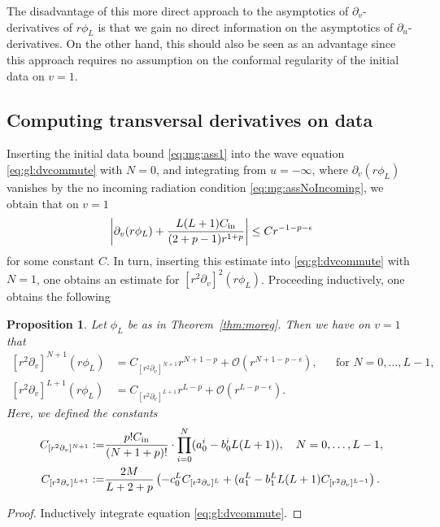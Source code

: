 \documentclass[11pt,english]{article}
\numberwithin{equation}{section}
\theoremstyle{remark}
\theoremstyle{plain}
\newtheorem{prop}{Proposition}[section]
\theoremstyle{remark}
\newcommand{\pu}{\partial_u}
\newcommand{\pv}{\partial_v}
\renewcommand{\(}{\left(}
\renewcommand{\)}{\right)}
\begin{document}
The disadvantage of this more direct approach to the asymptotics of $\pv$-derivatives of $r\phi_L$ is that we gain no direct information on the asymptotics of $\pu$-derivatives. On the other hand, this should also be seen as an advantage since this approach requires no assumption on the conformal regularity of the initial data on $v=1$. 

\subsection{Computing transversal derivatives on data}\label{sec:mg:data}
Inserting the initial data bound \eqref{eq:mg:ass1} into the wave equation \eqref{eq:gl:dvcommute} with $N=0$, and integrating from $u=-\infty$, where $\pv(r\phi_L)$ vanishes by the no incoming radiation condition \eqref{eq:mg:assNoIncoming}, we obtain that on $v=1$
\begin{equation}
\left|\pv(r\phi_L)+\frac{L(L+1)\ci}{(2+p-1)r^{1+p}}\right|\leq C r^{-1-p-\epsilon}
\end{equation}
for some constant $C$.
In turn, inserting this estimate into \eqref{eq:gl:dvcommute} with $N=1$, one obtains an estimate for $[r^2\pv]^2(r\phi_L)$. Proceeding inductively, one obtains the following
\newcommand{\cv}[1]{C_{[r^2\pv]^{#1}}}
\begin{prop}\label{prop:prop.10.1}  Let $\phi_L$ be as in Theorem~\ref{thm:moreg}. Then 
we have on $v=1$ that
\begin{align}\label{eq:mg:databounds}
[r^2\pv]^{N+1}(r\phi_L)&=\cv{N+1}r^{N+1-p}+\mathcal{O}(r^{N+1-p-\epsilon}),&&\text{for }N=0,\dots, L-1,\\
[r^2\pv]^{L+1}(r\phi_L)&=\cv{L+1}r^{L-p}+\mathcal{O}(r^{L-p-\epsilon}).&&
\end{align}
Here, we defined the constants
\begin{align}\label{eq:mg:cv}
\cv{N+1}:=& \frac{p!\ci}{(N+1+p)!}\cdot \prod_{i=0}^N(a_0^i-b_0^iL(L+1)),\quad N=0,\dots, L-1,\\
\cv{L+1}:=&\frac{2M}{L+2+p}\left(-c_0^L \cv{L}+(a_1^L-b_1^LL(L+1)\cv{L-1}\right).
\end{align}
\end{prop}
\begin{proof} Inductively integrate equation \eqref{eq:gl:dvcommute}.
\end{proof}
\end{document}
